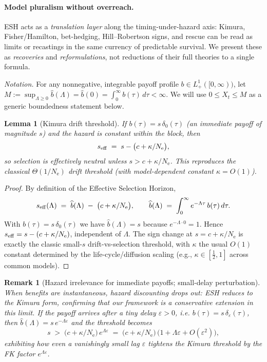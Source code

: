 \documentclass[11pt]{article}
\theoremstyle{upright}
\newtheorem{lemma}{Lemma}
\newtheorem{remark}{Remark}
\newcommand{\Ne}{N_{\mathrm{e}}}
\newcommand{\seff}[1][]{s_{\mathrm{eff}\if\relax\detokenize{#1}\relax\else,#1\fi}}
\begin{document}
\paragraph{Model pluralism without overreach.}
ESH acts as a \emph{translation layer} along the timing-under-hazard axis: Kimura, Fisher/Hamilton, bet-hedging, Hill–Robertson signs, and rescue can be read as limits or recastings in the same currency of predictable survival. We present these as \emph{recoveries} and \emph{reformulations}, not reductions of their full theories to a single formula.

\noindent\textit{Notation.} For any nonnegative, integrable payoff profile $b\in L^1_+([0,\infty))$,
let $M:=\sup_{\Lambda\ge 0}\widehat b(\Lambda)=\widehat b(0)=\int_0^\infty b(\tau)\,d\tau<\infty$.
We will use $0\le X_t\le M$ as a generic boundedness statement below.

\begin{lemma}[Kimura drift threshold]\label{lem:kimura}
If $b(\tau)=s\,\delta_0(\tau)$ (an immediate payoff of magnitude $s$) and the hazard is constant within the block, then
\[
\seff \;=\; s - \big(c+\kappa/\Ne\big),
\]
so selection is effectively neutral unless $s > c+\kappa/\Ne$. This reproduces the classical $\Theta(1/\Ne)$ drift threshold (with model-dependent constant $\kappa=O(1)$).
\end{lemma}

\begin{proof}
By definition of the Effective Selection Horizon,
\[
\seff(\Lambda)\;=\;\widehat b(\Lambda)\;-\;\big(c+\kappa/\Ne\big),
\qquad
\widehat b(\Lambda)\;=\;\int_0^\infty e^{-\Lambda\tau}\,b(\tau)\,d\tau.
\]
With $b(\tau)=s\,\delta_0(\tau)$ we have $\widehat b(\Lambda)=s$ because $e^{-\Lambda\cdot 0}=1$. Hence $\seff=s-(c+\kappa/\Ne)$, independent of $\Lambda$. The sign change at $s=c+\kappa/\Ne$ is exactly the classic small-$s$ drift-vs-selection threshold, with $\kappa$ the usual $O(1)$ constant determined by the life-cycle/diffusion scaling (e.g., $\kappa\in[\tfrac12,1]$ across common models).
\end{proof}

\begin{remark}[Hazard irrelevance for immediate payoffs; small-delay perturbation]
When benefits are instantaneous, hazard discounting drops out: ESH reduces to the Kimura form, confirming that our framework is a conservative extension in this limit. If the payoff arrives after a tiny delay $\varepsilon>0$, i.e. $b(\tau)=s\,\delta_\varepsilon(\tau)$, then $\widehat b(\Lambda)=s\,e^{-\Lambda\varepsilon}$ and the threshold becomes
\[
s \;>\; \big(c+\kappa/\Ne\big)\,e^{\Lambda\varepsilon}
\;=\; \big(c+\kappa/\Ne\big)\,\big(1+\Lambda\varepsilon+O(\varepsilon^2)\big),
\]
exhibiting how even a vanishingly small lag $\varepsilon$ tightens the Kimura threshold by the FK factor $e^{\Lambda\varepsilon}$.
\end{remark}
\end{document}
